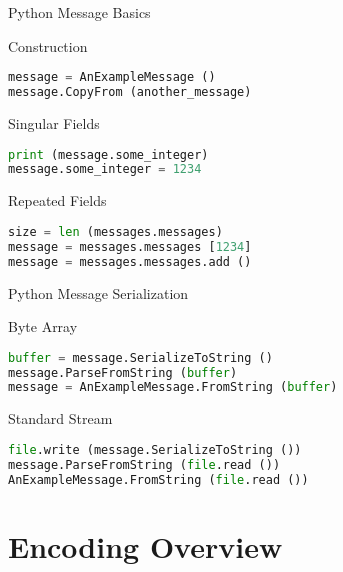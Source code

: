 \begin{frame}[fragile]{Python Message Basics}
    \begin{block}{Construction}
\begin{lstlisting}[language=python,style=mini]
message = AnExampleMessage ()
message.CopyFrom (another_message)
\end{lstlisting}
    \end{block}
    \begin{block}{Singular Fields}
\begin{lstlisting}[language=python,style=mini]
print (message.some_integer)
message.some_integer = 1234
\end{lstlisting}
    \end{block}
    \begin{block}{Repeated Fields}
\begin{lstlisting}[language=python,style=mini]
size = len (messages.messages)
message = messages.messages [1234]
message = messages.messages.add ()
\end{lstlisting}
    \end{block}
\end{frame}


\begin{frame}[fragile]{Python Message Serialization}
    \begin{block}{Byte Array}
\begin{lstlisting}[language=python,style=mini]
buffer = message.SerializeToString ()
message.ParseFromString (buffer)
message = AnExampleMessage.FromString (buffer)
\end{lstlisting}
    \end{block}

    \bigskip

    \begin{block}{Standard Stream}
\begin{lstlisting}[language=python,style=mini]
file.write (message.SerializeToString ())
message.ParseFromString (file.read ())
AnExampleMessage.FromString (file.read ())
\end{lstlisting}
    \end{block}
\end{frame}


\section{Encoding Overview}


